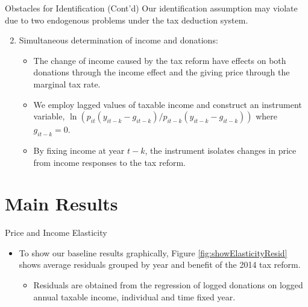 \documentclass[
  ignorenonframetext,
]{beamer}
\providecommand{\tightlist}{%
  \setlength{\itemsep}{0pt}\setlength{\parskip}{0pt}}
\begin{document}
\begin{frame}{Obstacles for Identification (Cont'd)}
\protect\hypertarget{obstacles-for-identification-contd}{}
Our identification assumption may violate due to two endogenous problems under the tax deduction system.

\begin{enumerate}
\setcounter{enumi}{1}
\tightlist
\item
  Simultaneous determination of income and donations:

  \begin{itemize}
  \tightlist
  \item
    The change of income caused by the tax reform have effects on both donations through the income effect and the giving price through the marginal tax rate.
  \item
    We employ lagged values of taxable income and construct an instrument variable, \(\ln (p_{it}(y_{it-k} - g_{it-k})/p_{it-k}(y_{it-k} - g_{it-k}))\) where \(g_{it-k} = 0\).
  \item
    By fixing income at year \(t - k\), the instrument isolates changes in price from income responses to the tax reform.
  \end{itemize}
\end{enumerate}
\end{frame}

\hypertarget{main-results}{%
\section{Main Results}\label{main-results}}

\begin{frame}{Price and Income Elasticity}
\protect\hypertarget{price-and-income-elasticity}{}
\begin{itemize}
\tightlist
\item
  To show our baseline results graphically, Figure \ref{fig:showElasticityResid} shows average residuals grouped by year and benefit of the 2014 tax reform.

  \begin{itemize}
  \tightlist
  \item
    Residuals are obtained from the regression of logged donations on logged annual taxable income, individual and time fixed year.
  \end{itemize}
\end{itemize}
\end{frame}
\end{document}

